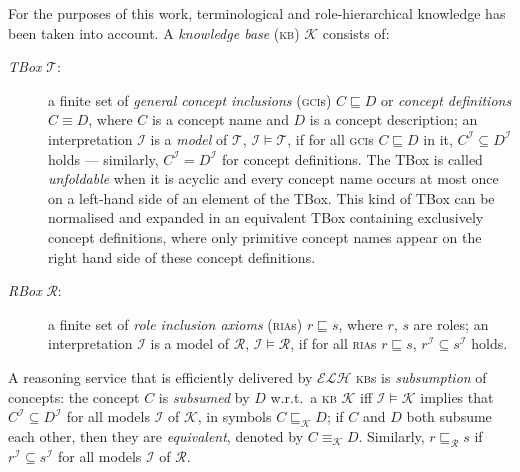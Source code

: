 \documentclass[]{llncs}
\newcommand{\elh}{\(\mathcal{ELH}{}\)}
\newcommand{\kb}{\textsc{kb}}
\newcommand{\ria}{\textsc{ria}}
\newcommand{\gci}{\textsc{gci}}
\newcommand{\subsume}[1]{\sqsubseteq_{\mathcal{#1}}}
\begin{document}
  For the purposes of this work, terminological and role-hierarchical knowledge has been taken into account.
  A \emph{knowledge base} (\kb) \(\mathcal{K}\) consists of:
  \begin{description}
    \item[\emph{TBox} \(\mathcal{T}\):] a finite set of \emph{general concept inclusions} (\textsc{gci}s) \(C \sqsubseteq D\) or \emph{concept definitions} \(C \equiv D\), where \(C\) is a concept name and \(D\) is a concept description;
    an interpretation \(\mathcal{I}\) is a \emph{model} of \(\mathcal{T}\), \(\mathcal{I} \models \mathcal{T}\), if for all \gci{}s \(C \sqsubseteq D\) in it, \(C^\mathcal{I} \subseteq D^\mathcal{I}\) holds --- similarly, \(C^\mathcal{I} = D^\mathcal{I}\) for concept definitions.
    The TBox is called \emph{unfoldable} when it is acyclic and every concept name occurs at most once on a left-hand side of an element of the TBox.
    This kind of TBox can be normalised and expanded in an equivalent TBox containing exclusively concept definitions, where only primitive concept names appear on the right hand side of these concept definitions.
    \item[\emph{RBox} \(\mathcal{R}\):] a finite set of \emph{role inclusion axioms} (\ria{}s) \(r \sqsubseteq s\), where \(r\), \(s\) are roles; an interpretation \(\mathcal{I}\) is a model of \(\mathcal{R}\), \(\mathcal{I} \models \mathcal{R}\), if for all \ria{}s \(r \sqsubseteq s\), \(r^\mathcal{I} \subseteq s^\mathcal{I}\) holds.
  \end{description}

  A reasoning service that is efficiently delivered by \elh{} \kb{}s is \emph{subsumption} of concepts: the concept \(C\) is \emph{subsumed} by \(D\) w.r.t.\ a \kb{} \(\mathcal{K}\) iff \(\mathcal{I} \models \mathcal{K}\) implies that \(C^\mathcal{I} \subseteq D^\mathcal{I}\) for all models \(\mathcal{I}\) of \(\mathcal{K}\), in symbols \(C \subsume{K} D\);
  if \(C\) and \(D\) both subsume each other, then they are \emph{equivalent}, denoted by \(C \equiv_{\mathcal{K}} D\).
  Similarly, \(r \subsume{R} s\) if \(r^\mathcal{I} \subseteq s^\mathcal{I}\) for all models \(\mathcal{I}\) of \(\mathcal{R}\).
\end{document}
